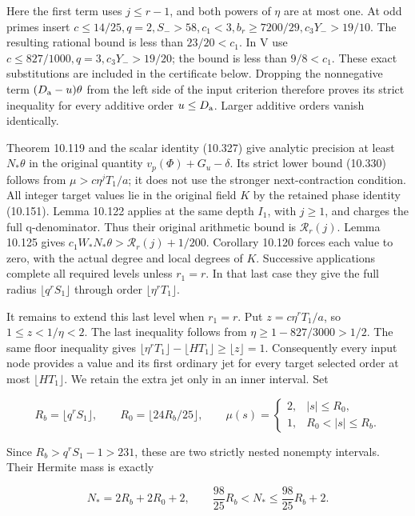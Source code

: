 \documentclass[
  11pt,
  a4paper,
]{article}
\newcounter{none} %
\begin{document}
Here the first term uses \(j\le r-1\), and both powers of \(\eta\) are
at most one. At odd primes insert
\(c\le14/25,q=2,S_->58,c_1<3,b_r\ge7200/29,c_3Y_->19/10\). The resulting
rational bound is less than \(23/20<c_1\). In V use
\(c\le827/1000,q=3,c_3Y_->19/20\); the bound is less than \(9/8<c_1\).
These exact substitutions are included in the certificate below.
Dropping the nonnegative term \((D_{\rm a}-u)\theta\) from the left side
of the input criterion therefore proves its strict inequality for every
additive order \(u\le D_{\rm a}\). Larger additive orders vanish
identically.

Theorem 10.119 and the scalar identity (10.327) give analytic precision
at least \(N_*\theta\) in the original quantity
\(v_p(\Phi)+G_u-\delta\). Its strict lower bound (10.330) follows from
\(\mu>c\eta^jT_1/a\); it does not use the stronger next-contraction
condition. All integer target values lie in the original field \(K\) by
the retained phase identity (10.151). Lemma 10.122 applies at the same
depth \(I_1\), with \(j\ge1\), and charges the full q-denominator. Thus
their original arithmetic bound is \(\mathcal R_r(j)\). Lemma 10.125
gives \(c_1W_*N_*\theta>\mathcal R_r(j)+1/200\). Corollary 10.120 forces
each value to zero, with the actual degree and local degrees of \(K\).
Successive applications complete all required levels unless \(r_1=r\).
In that last case they give the full radius \(\lfloor q^rS_1\rfloor\)
through order \(\lfloor\eta^rT_1\rfloor\).

It remains to extend this last level when \(r_1=r\). Put
\(z=c\eta^rT_1/a\), so \(1\le z<1/\eta<2\). The last inequality follows
from \(\eta\ge1-827/3000>1/2\). The same floor inequality gives
\(\lfloor\eta^rT_1\rfloor-\lfloor HT_1\rfloor\ge\lfloor z\rfloor=1\).
Consequently every input node provides a value and its first ordinary
jet for every target selected order at most \(\lfloor HT_1\rfloor\). We
retain the extra jet only in an inner interval. Set

\[
R_b=\lfloor q^rS_1\rfloor,\qquad R_0=\lfloor24R_b/25\rfloor,
\qquad
\mu(s)=\begin{cases}2,&|s|\le R_0,\\1,&R_0<|s|\le R_b.\end{cases}
\tag{10.405}
\]

Since \(R_b>q^rS_1-1>231\), these are two strictly nested nonempty
intervals. Their Hermite mass is exactly

\[
N_*=2R_b+2R_0+2,
\qquad \frac{98}{25}R_b<N_*\le\frac{98}{25}R_b+2.
\tag{10.406}
\]
\end{document}
